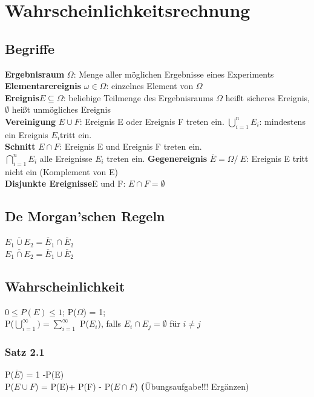 \section{Wahrscheinlichkeitsrechnung}
  \subsection{Begriffe}
  \textbf{Ergebnisraum} $\Omega$: Menge aller möglichen Ergebnisse eines Experiments\\
  \textbf{Elementarereignis} $\omega \in \Omega$: einzelnes Element von $\Omega$\\
  \textbf{Ereignis}$E \subseteq \Omega$: beliebige Teilmenge des Ergebnisraums $\Omega$ heißt sicheres Ereignis, $\emptyset$ heißt unmögliches Ereignis\\
  \textbf{Vereinigung} $E \cup F$: Ereignis E oder Ereignis F treten ein. $\bigcup_{i=1}^{n} E_{i}$: mindestens ein Ereignis $E_{i} $tritt ein.\\
  \textbf{Schnitt} $E \cap F$: Ereignis E und Ereignis F treten ein.\\
  $\bigcap_{i=1}^{n} E_{i}$ alle Ereignisse $E_{i}$ treten ein.
  \textbf{Gegenereignis} $\overline{E} = \Omega /\ E$: Ereignis E tritt nicht ein (Komplement von E)\\
  \textbf{Disjunkte Ereignisse}E  und F: $E \cap F = \emptyset$
  \subsection{De Morgan'schen Regeln}
  $\overline{E_{1} \cup E_{2}} = \overline{E}_{1} \cap \overline{E}_{2}$\\
  $ \overline{E_{1} \cap E_{2}} = \overline{E}_{1} \cup \overline{E}_{2}$
  \subsection{Wahrscheinlichkeit}
  $0 \le P(E) \le 1$; P($\Omega$) = 1;\\
  P($\bigcup_{i=1}^{\infty}) = \sum_{i=1}^{\infty}$ P($E_{i}$), falls $E_{i} \cap E_{j} = \emptyset$ für $i \neq j$\\
    \subsubsection{Satz 2.1}
    P($\overline{E}$) = 1 -P(E)\\
    P($E \cup F$) = P(E)+ P(F) - P($E \cap F$)
  \textbf(Übungsaufgabe!!! Ergänzen)\\
